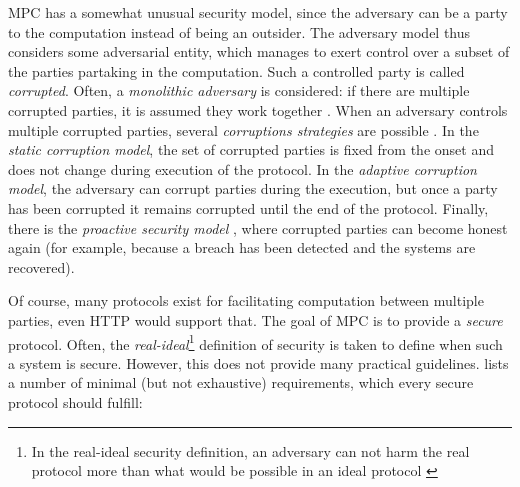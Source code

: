 \gls{MPC} has a somewhat unusual security model, since the adversary can be a party to the computation instead of being an outsider. The adversary model thus considers some adversarial entity, which manages to exert control over a subset of the parties partaking in the computation. Such a controlled party is called \textit{corrupted}. Often, a \textit{monolithic adversary} is considered: if there are multiple corrupted parties, it is assumed they work together \citep{mpc-good-practice}. When an adversary controls multiple corrupted parties, several \textit{corruptions strategies} are possible \citep{secure-mpc}. In the \textit{static corruption model}, the set of corrupted parties is fixed from the onset and does not change during execution of the protocol. In the \textit{adaptive corruption model}, the adversary can corrupt parties during the execution, but once a party has been corrupted it remains corrupted until the end of the protocol. Finally, there is the \textit{proactive security model} \citep{sec-transient-failures}, where corrupted parties can become honest again (for example, because a breach has been detected and the systems are recovered).

Of course, many protocols exist for facilitating computation between multiple parties, even HTTP would support that. The goal of \gls{MPC} is to provide a \textit{secure} protocol. Often, the \textit{real-ideal}\footnote{In the real-ideal security definition, an adversary can not harm the real protocol more than what would be possible in an ideal protocol \citep{mpc}} definition of security is taken to define when such a system is secure. However, this does not provide many practical guidelines. \citet{secure-mpc} lists a number of minimal (but not exhaustive) requirements, which every secure protocol should fulfill:


